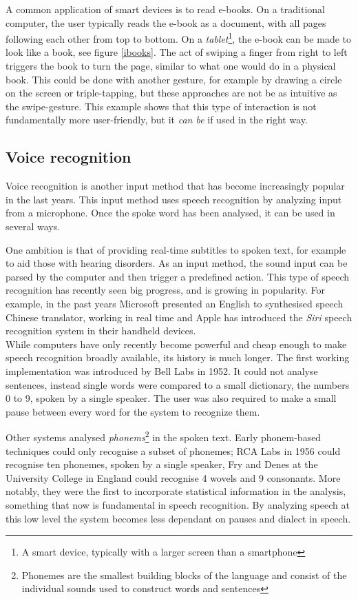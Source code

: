 A common application of smart devices is to read e-books. On a traditional computer, the user typically reads the e-book as a document, with all pages following each other from top to bottom. On a \emph{tablet}\footnote{A smart device, typically with a larger screen than a smartphone}, the e-book can be made to look like a book, see figure \ref{ibooks}. The act of swiping a finger from right to left triggers the book to turn the page, similar to what one would do in a physical book. This could be done with another gesture, for example by drawing a circle on the screen or triple-tapping, but these approaches are not be as intuitive as the swipe-gesture. This example shows that this type of interaction is not fundamentally more user-friendly, but it \emph{can be} if used in the right way. 

\subsection{Voice recognition}

Voice recognition is another input method that has become increasingly popular in the last years. This input method uses speech recognition by analyzing input from a microphone. Once the spoke word has been analysed, it can be used in several ways.

One ambition is that of providing real-time subtitles to spoken text, for example to aid those with hearing disorders. As an input method, the sound input can be parsed by the computer and then trigger a predefined action. This type of speech recognition has recently seen big progress, and is growing in popularity. For example, in the past years Microsoft presented an English to synthesised speech Chinese translator, working in real time and Apple has introduced the \emph{Siri} speech recognition system in their handheld devices.\\

While computers have only recently become powerful and cheap enough to make speech recognition broadly available, its history is much longer. The first working implementation was introduced by Bell Labs in 1952\cite{Davis52}. It could not analyse sentences, instead single words were compared to a small dictionary, the numbers 0 to 9, spoken by a single speaker\cite{juang}. The user was also required to make a small pause between every word for the system to recognize them.

Other systems analysed \emph{phonems}\footnote{Phonemes are the smallest building blocks of the language and consist of the individual sounds used to construct words and sentences} in the spoken text. Early phonem-based techniques could only recognise a subset of phonemes; RCA Labs in 1956 could recognise ten phonemes, spoken by a single speaker, Fry and Denes at the University College in England could recognise 4 wovels and 9 consonants. More notably, they were the first to incorporate statistical information in the analysis\cite{juang}, something that now is fundamental in speech recognition. By analyzing speech at this low level the system becomes less dependant on pauses and dialect in speech.

